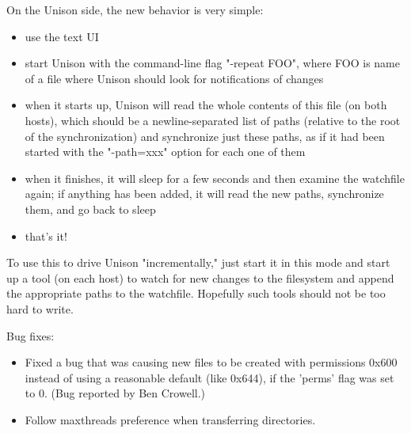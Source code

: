 \begin{changesfromversion}{2.27}
  On the Unison side, the new behavior is very simple:
  \begin{itemize}
  \item use the text UI
    \item start Unison with the command-line flag "-repeat FOO",
      where FOO is name of a file where Unison should look
      for notifications of changes
    \item  when it starts up, Unison will read the whole contents
      of this file (on both hosts), which should be a
      newline-separated list of paths (relative to the root
      of the synchronization) and synchronize just these paths,
      as if it had been started with the "-path=xxx" option for
      each one of them
    \item when it finishes, it will sleep for a few seconds and then
      examine the watchfile again; if anything has been added, it
      will read the new paths, synchronize them, and go back to
      sleep
    \item that's it!
  \end{itemize}
  To use this to drive Unison "incrementally," just start it in
  this mode and start up a tool (on each host) to watch for
  new changes to the filesystem and append the appropriate paths
  to the watchfile.  Hopefully such tools should not be too hard
  to write.
\item Bug fixes:
\begin{itemize}
\item Fixed a bug that was causing new files to be created with
  permissions 0x600 instead of using a reasonable default (like
  0x644), if the 'perms' flag was set to 0.  (Bug reported by Ben
  Crowell.)
\item Follow maxthreads preference when transferring directories.
\end{itemize}
\end{changesfromversion}

